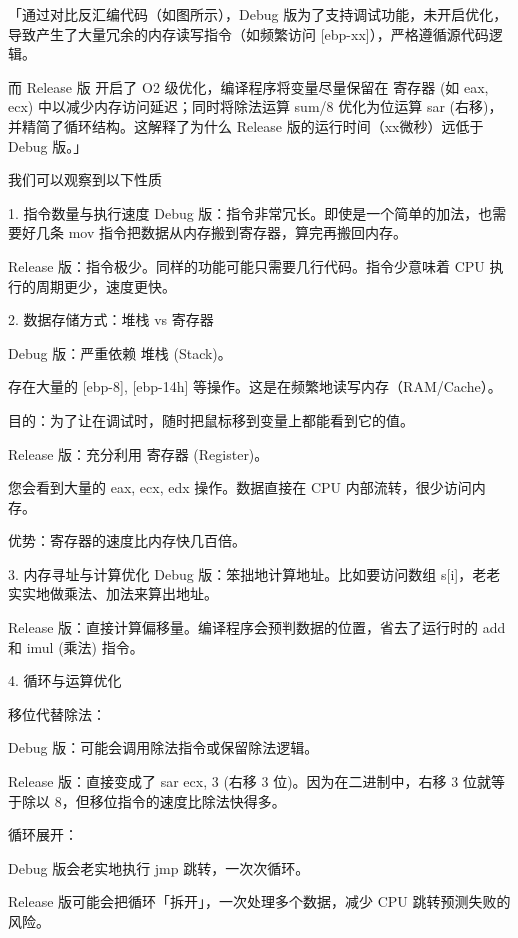 \documentclass[supercite]{Experimental_Report}
\theoremstyle{definition}
\begin{document}
	
	「通过对比反汇编代码（如图所示），Debug 版为了支持调试功能，未开启优化，导致产生了大量冗余的内存读写指令（如频繁访问 [ebp-xx]），严格遵循源代码逻辑。
	
	而 Release 版 开启了 O2 级优化，编译程序将变量尽量保留在 寄存器 (如 eax, ecx) 中以减少内存访问延迟；同时将除法运算 sum/8 优化为位运算 sar (右移)，并精简了循环结构。这解释了为什么 Release 版的运行时间（xx微秒）远低于 Debug 版。」
	
	我们可以观察到以下性质
	
	1. 指令数量与执行速度
	Debug 版：指令非常冗长。即使是一个简单的加法，也需要好几条 mov 指令把数据从内存搬到寄存器，算完再搬回内存。
	
	Release 版：指令极少。同样的功能可能只需要几行代码。指令少意味着 CPU 执行的周期更少，速度更快。
	
	2. 数据存储方式：堆栈 vs 寄存器
	
	Debug 版：严重依赖 堆栈 (Stack)。
	
	存在大量的 [ebp-8], [ebp-14h] 等操作。这是在频繁地读写内存（RAM/Cache）。
	
	目的：为了让在调试时，随时把鼠标移到变量上都能看到它的值。
	
	Release 版：充分利用 寄存器 (Register)。
	
	您会看到大量的 eax, ecx, edx 操作。数据直接在 CPU 内部流转，很少访问内存。
	
	优势：寄存器的速度比内存快几百倍。
	
	3. 内存寻址与计算优化
	Debug 版：笨拙地计算地址。比如要访问数组 s[i]，老老实实地做乘法、加法来算出地址。
	
	Release 版：直接计算偏移量。编译程序会预判数据的位置，省去了运行时的 add 和 imul (乘法) 指令。
	
	4. 循环与运算优化
	
	移位代替除法：
	
	Debug 版：可能会调用除法指令或保留除法逻辑。
	
	Release 版：直接变成了 sar ecx, 3 (右移 3 位)。因为在二进制中，右移 3 位就等于除以 8，但移位指令的速度比除法快得多。
	
	循环展开：
	
	Debug 版会老实地执行 jmp 跳转，一次次循环。
	
	Release 版可能会把循环「拆开」，一次处理多个数据，减少 CPU 跳转预测失败的风险。
	
	
\end{document}
